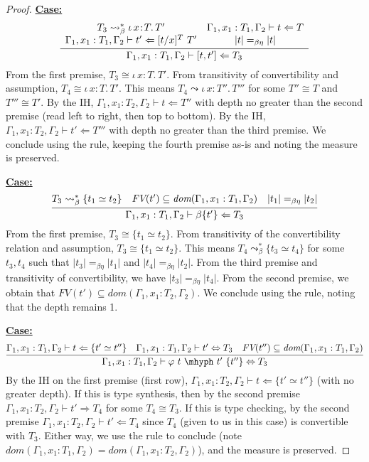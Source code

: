 \documentclass{article}
\newcommand{\abs}[4]{{#1}\, #2\! : \! #3.\, #4}
\newcommand{\tpcheck}[0]{\Leftarrow}
\newcommand{\tpsynth}[0]{\Rightarrow}
\newcommand{\startcase}[1]{\vspace{#1} \noindent\textbf{\underline{Case:}}}
\begin{document}
\begin{proof}
  \startcase{.2cm}
  \[
    \infer{
      \Gamma_1,x_1:T_1,\Gamma_2 \vdash [ t , t' ] \tpcheck T_3
    }{
      \begin{array}{cc}
        T_3 \leadsto_\beta^* \abs{\iota}{x}{T}{T'}
        & \Gamma_1,x_1:T_1,\Gamma_2 \vdash t \tpcheck T
        \\ \Gamma_1,x_1:T_1,\Gamma_2 \vdash t' \tpcheck [t/x]^{T}\ T'
        & |t| =_{\beta\eta} |t|
      \end{array}
    }
  \]
  From the first premise, \(T_3 \cong \abs{\iota}{x}{T}{T'}\).
  From transitivity of convertibility and assumption, \(T_4 \cong
  \abs{\iota}{x}{T}{T'}\).
  This means \(T_4 \leadsto \abs{\iota}{x}{T''}{T'''}\) for some \(T'' \cong T\)
  and \(T''' \cong T'\).
  By the IH, \(\Gamma_1,x_1:T_2,\Gamma_2 \vdash t \tpcheck T''\) with depth no
  greater than the second premise (read left to right, then top to bottom).
  By the IH, \(\Gamma_1,x_1:T_2,\Gamma_2 \vdash t' \tpcheck T'''\) with depth no
  greater than the third premise.
  We conclude using the rule, keeping the fourth premise as-is and noting the
  measure is preserved.

  \startcase{.2cm}
  \[
    \infer{
      \Gamma_1,x_1:T_1,\Gamma_2 \vdash \beta\{t'\} \tpcheck T_3
    }{
      T_3 \leadsto_\beta^* \{t_1 \simeq t_2\}
      \quad \textit{FV}(t')\subseteq \textit{dom}(\Gamma_1,x_1:T_1,\Gamma_2)
      \quad |t_1| =_{\beta\eta} |t_2|
    }
  \]
  From the first premise, \(T_3 \cong \{t_1 \simeq t_2\}\).
  From transitivity of the convertibility relation and assumption, \(T_3 \cong
  \{t_1 \simeq t_2\}\).
  This means \(T_4 \leadsto_\beta^* \{t_3 \simeq t_4\}\) for some \(t_3,t_4\)
  such that \(|t_3| =_{\beta\eta} |t_1|\) and \(|t_4| =_{\beta\eta} |t_2|\).
  From the third premise and transitivity of convertibility, we have \(|t_3|
  =_{\beta\eta} |t_4|\).
  From the second premise, we obtain that \(\textit{FV}(t') \subseteq
  \textit{dom}(\Gamma_1,x_1:T_2,\Gamma_2)\).
  We conclude using the rule, noting that the depth remains 1.

  \startcase{.2cm}
  \[
    \infer{\Gamma_1,x_1:T_1,\Gamma_2\vdash \varphi\ t\ \mhyph\ t'\ \{t''\} \Leftrightarrow T_3}
    {
      \Gamma_1,x_1:T_1,\Gamma_2\vdash t\tpcheck \{t' \simeq t''\}
      & \Gamma_1,x_1:T_1,\Gamma_2\vdash t' \Leftrightarrow T_3
      & \textit{FV}(t'') \subseteq \textit{dom}(\Gamma_1,x_1:T_1,\Gamma_2)
    }
  \]
  By the IH on the first premise (first row), \(\Gamma_1,x_1:T_2,\Gamma_2 \vdash
  t \tpcheck \{t' \simeq t''\}\) (with no greater depth).
  If this is type synthesis, then by the second premise
  \(\Gamma_1,x_1:T_2,\Gamma_2 \vdash t' \tpsynth T_4\) for some \(T_4 \cong
  T_3\).
  If this is type checking, by the second premise \(\Gamma_1,x_1:T_2,\Gamma_2
  \vdash t' \tpcheck T_4\) since \(T_4\) (given to us in this case) is
  convertible with \(T_3\).
  Either way, we use the rule to conclude (note
  \(\textit{dom}(\Gamma_1,x_1:T_1,\Gamma_2) =
  \textit{dom}(\Gamma_1,x_1:T_2,\Gamma_2)\)), and the measure is preserved.


\end{proof}
\end{document}
